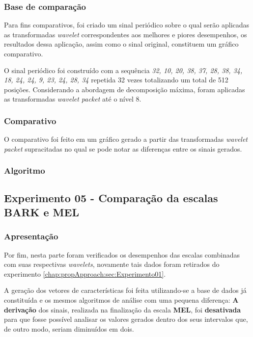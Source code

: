 			\subsubsection{Base de comparação}
				\par Para fins comparativos, foi criado um sinal periódico sobre o qual serão aplicadas as transformadas \textit{wavelet} correspondentes aos melhores e piores desempenhos, os resultados dessa aplicação, assim como o sinal original, constituem um gráfico comparativo.
				\par O sinal periódico foi construído com a sequência \textit{32, 10, 20, 38, 37, 28, 38, 34, 18, 24, 24, 9, 23, 24, 28, 34} repetida 32 vezes totalizando um total de 512 posições. Considerando a abordagem de decomposição máxima, foram aplicadas as transformadas \textit{wavelet packet} até o nível 8.
			\subsubsection{Comparativo}
				\par O comparativo foi feito em um gráfico gerado a partir das transformadas \textit{wavelet packet} supracitadas no qual se pode notar as diferenças entre os sinais gerados.
			\subsubsection{Algoritmo}
				

		\subsection{Experimento 05 - Comparação da escalas BARK e MEL}
		\label{chap:propApproach:sec:Experimento05}
			\subsubsection{Apresentação}
				\par Por fim, nesta parte foram verificados os desempenhos das escalas combinadas com suas respectivas \textit{wavelets}, novamente tais dados foram retirados do experimento \ref{chap:propApproach:sec:Experimento01}.
				\par A geração dos vetores de características foi feita utilizando-se a base de dados já constituída e os mesmos algoritmos de análise com uma pequena diferença: \textbf{A derivação} dos sinais, realizada na finalização da escala \textbf{MEL}, foi \textbf{desativada} para que fosse possível analisar os valores gerados dentro dos seus intervalos que, de outro modo, seriam diminuídos em dois.

